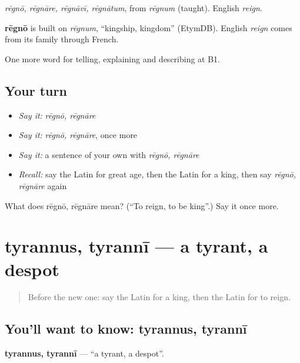 \emph{rēgnō, rēgnāre, rēgnāvī, rēgnātum}, from \emph{rēgnum} (taught). English \emph{reign}.

\begin{cousinweb}
\textbf{rēgnō} is built on \emph{rēgnum}, \textquotedblleft{}kingship, kingdom\textquotedblright{} (EtymDB). English \emph{reign} comes from its family through French.
\end{cousinweb}

\begin{grammarlens}[title={What you've built}]
One more word for telling, explaining and describing at B1.
\end{grammarlens}

\subsection*{Your turn}
\begin{itemize}
\raggedright
  \item \emph{Say it:} \emph{rēgnō, rēgnāre}
  \item \emph{Say it:} \emph{rēgnō, rēgnāre}, once more
  \item \emph{Say it:} a sentence of your own with \emph{rēgnō, rēgnāre}
  \item \emph{Recall:} say the Latin for great age, then the Latin for a king, then say \emph{rēgnō, rēgnāre} again
\end{itemize}

\begin{tcolorbox}[breakable,colback=teal!4,colframe=teal!35!black,title={Before you move on}]
What does rēgnō, rēgnāre mean? (\textquotedblleft{}To reign, to be king\textquotedblright{}.) Say it once more.
\end{tcolorbox}
\section[tyrannus, tyrannī]{tyrannus, tyrannī — a tyrant, a despot}

\label{lesson:LA-C345-tyrannus}



\begin{quote}
Before the new one: say the Latin for a king, then the Latin for to reign.
\end{quote}

\subsection*{You'll want to know: tyrannus, tyrannī}
\textbf{tyrannus, tyrannī} — \textquotedblleft{}a tyrant, a despot\textquotedblright{}.

